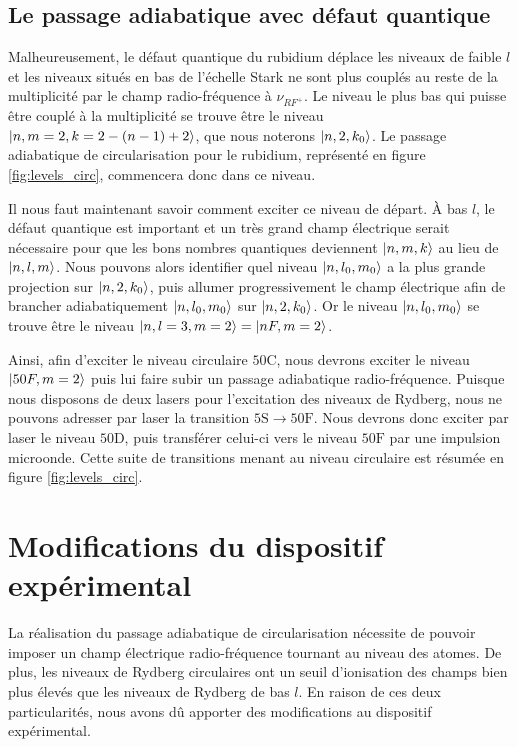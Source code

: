  \subsection{Le passage adiabatique avec défaut quantique}\label{subsec:adiab_Qdefect}
\noindent Malheureusement, le défaut quantique du rubidium déplace les niveaux de faible $l$ et les niveaux situés en bas de l'échelle Stark ne sont plus couplés au reste de la multiplicité par le champ radio-fréquence à $\nu_{RF^+}$.
Le niveau le plus bas qui puisse être couplé à la multiplicité se trouve être le niveau $\ket{n,m=2,k=2-(n-1)+2}$, que nous noterons $\ket{n,2,k_0}$.
Le passage adiabatique de circularisation pour le rubidium, représenté en figure \eqref{fig:levels_circ}, commencera donc dans ce niveau.

Il nous faut maintenant savoir comment exciter ce niveau de départ.
\`A bas $l$, le défaut quantique est important et un très grand champ électrique serait nécessaire pour que les bons nombres quantiques deviennent $\ket{n,m,k}$ au lieu de $\ket{n,l,m}$.
Nous pouvons alors identifier quel niveau $\ket{n,l_0,m_0}$ a la plus grande projection sur $\ket{n,2,k_0}$, puis allumer progressivement le champ électrique afin de brancher adiabatiquement $\ket{n,l_0,m_0}$ sur $\ket{n,2,k_0}$.
Or le niveau $\ket{n,l_0,m_0}$ se trouve être le niveau $\ket{n,l=3,m=2}=\ket{nF,m=2}$.

Ainsi, afin d'exciter le niveau circulaire $\mathrm{50C}$, nous devrons exciter le niveau $\ket{50F,m=2}$ puis lui faire subir un passage adiabatique radio-fréquence.
Puisque nous disposons de deux lasers pour l'excitation des niveaux de Rydberg, nous ne pouvons adresser par laser la transition $\mathrm{5S}\rightarrow\mathrm{50F}$.
Nous devrons donc exciter par laser le niveau $\mathrm{50D}$, puis transférer celui-ci vers le niveau $\mathrm{50F}$ par une impulsion microonde.
Cette suite de transitions menant au niveau circulaire est résumée en figure \ref{fig:levels_circ}.

\section{Modifications du dispositif expérimental}

\noindent La réalisation du passage adiabatique de circularisation nécessite de pouvoir imposer un champ électrique radio-fréquence tournant au niveau des atomes.
De plus, les niveaux de Rydberg circulaires ont un seuil d'ionisation des champs bien plus élevés que les niveaux de Rydberg de bas $l$\cite{TXT_GALLAGHER}.
En raison de ces deux particularités, nous avons dû apporter des modifications au dispositif expérimental.

